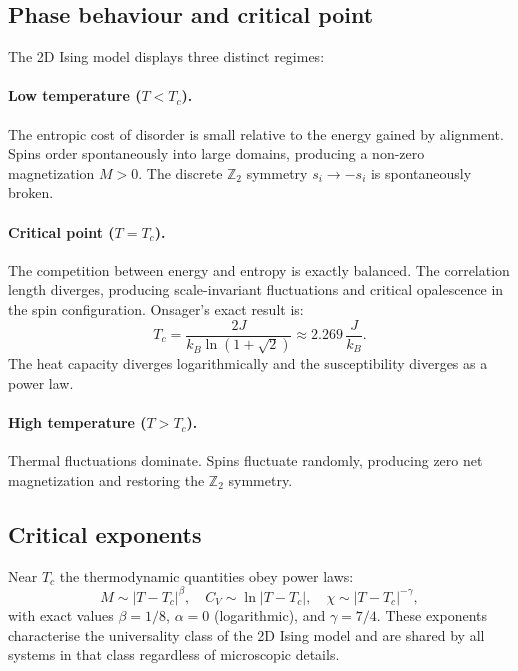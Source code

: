\documentclass[11pt,a4paper]{article}
\begin{document}
\subsection{Phase behaviour and critical point}

The 2D Ising model displays three distinct regimes:

\paragraph{Low temperature ($T < T_c$).}
The entropic cost of disorder is small relative to the energy gained by
alignment. Spins order spontaneously into large domains, producing a
non-zero magnetization $M > 0$. The discrete $\mathbb{Z}_2$ symmetry
$s_i \to -s_i$ is spontaneously broken.

\paragraph{Critical point ($T = T_c$).}
The competition between energy and entropy is exactly balanced. The
correlation length diverges, producing scale-invariant fluctuations and
critical opalescence in the spin configuration. Onsager's exact result is:
\begin{equation}
  T_c = \frac{2J}{k_B \ln(1+\sqrt{2})} \approx 2.269\,\frac{J}{k_B}.
  \label{eq:tc}
\end{equation}
The heat capacity diverges logarithmically and the susceptibility diverges
as a power law.

\paragraph{High temperature ($T > T_c$).}
Thermal fluctuations dominate. Spins fluctuate randomly, producing zero
net magnetization and restoring the $\mathbb{Z}_2$ symmetry.

\subsection{Critical exponents}

Near $T_c$ the thermodynamic quantities obey power laws:
\begin{equation}
  M \sim |T - T_c|^\beta, \quad C_V \sim \ln|T - T_c|, \quad
  \chi \sim |T - T_c|^{-\gamma},
  \label{eq:exponents}
\end{equation}
with exact values $\beta = 1/8$, $\alpha = 0$ (logarithmic), and
$\gamma = 7/4$. These exponents characterise the universality class of
the 2D Ising model and are shared by all systems in that class regardless
of microscopic details.
\end{document}

